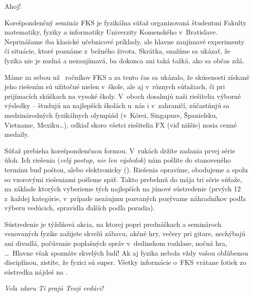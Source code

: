 Ahoj!

Korešpondenčný seminár FKS je fyzikálna súťaž organizovaná študentmi Fakulty
matematiky, fyziky a informatiky Univerzity Komenského v~Bratislave. Neprinášame
iba klasické učebnicové príklady, ale hlavne zaujímavé experimenty či situácie,
ktoré poznáme z~bežného života. Skrátka, snažíme sa ukázať, že fyzika nie je
nudná a nezaujímavá, ba dokonca ani taká ťažká, ako sa občas zdá.

Máme za sebou už \the\numexpr{}\relax\ ročníkov FKS a za tento čas sa ukázalo, že skúsenosti
získané jeho riešením sú užitočné nielen v~škole, ale aj v~rôznych súťažiach, či
pri prijímacích skúškach na vysoké školy. V~oboch dosahujú naši riešitelia
výborné výsledky -- študujú na najlepších školách u~nás i v~zahraničí,
zúčastňujú sa medzinárodných fyzikálnych olympiád (v~Kórei, Singapure,
Španielsku, Vietname, Mexiku\dots), odkiaľ skoro všetci riešitelia FX (viď nižšie)
nosia cenné medaily.

Súťaž prebieha korešpondenčnou formou. V~rukách držíte zadania prvej série úloh.
Ich riešenia (\emph{celý postup, nie len výsledok}) nám pošlite do stanoveného termínu
buď poštou, alebo elektronicky (\URL{\seminarSubmitURL}). Riešenia opravíme,
obodujeme a spolu so vzorovými riešeniami pošleme späť. Takto prebehnú do
mája tri série súťaže, na základe ktorých vyberieme tých najlepších na
júnové sústredenie (prvých 12 z~každej kategórie, v~prípade nezáujmu
pozvaných pozývame náhradníkov podľa výberu vedúcich, spravidla ďalších podľa
poradia).

Sústredenie je týždňová akcia, na ktorej popri prednáškach a seminároch
venovaných fyzike zažijete skvelú zábavu, akčné hry, večery pri gitare,
nechýbajú ani divadlá, počúvanie poplašných správ v~dedinskom rozhlase, nočná
hra, \dots\ Hlavne však spoznáte skvelých ľudí! Ak aj fyzika nebola vždy vašou
obľúbenou disciplínou, zistíte, že fyzici sú super.  Všetky informácie o~FKS
vrátane fotiek zo sústredka nájdeš na \URL{\seminarURL}.

\hfill \emph{Veľa zdaru Ti prajú Tvoji vedúci!}
